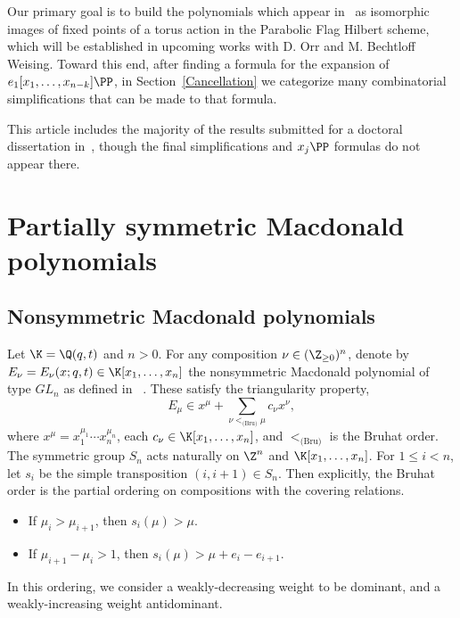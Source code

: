 Our primary goal is to build the polynomials which appear in~\cite{MR4081116} as isomorphic images of fixed points of a torus action in the Parabolic Flag Hilbert scheme, which will be established in upcoming works with D. Orr and M. Bechtloff Weising. Toward this end, after finding a formula for the expansion of $e_1[x_1, \dotsc, x_{n-k}] \PP$, in Section~\ref{Cancellation} we categorize many combinatorial simplifications that can be made to that formula.

This article includes the majority of the results submitted for a doctoral dissertation in~\cite{Dissertation}, though the final simplifications and $x_j \PP$ formulas do not appear there.



\section{Partially symmetric Macdonald polynomials}

\subsection{Nonsymmetric Macdonald polynomials}

Let $\K=\Q(q,t)$ and $n>0$. For any composition $\nu\in(\Z_{\ge 0})^n$, denote by $E_\nu =E_\nu(x;q,t)\in \K[x_1,\dotsc,x_n]$ the nonsymmetric Macdonald polynomial of type $GL_n$ as defined in ~\cite{MR2405160}. These satisfy the triangularity property,
\begin{equation}\label{Etriangularity} E_\mu \in x^\mu + \sum_{\nu <_{\text{(Bru)}} \mu} c_\nu x^\nu,\end{equation}
where $x^\mu = x_1^{\mu_1} \dotsm x_n^{\mu_n}$, each $c_\nu \in \K[x_1,\dotsc, x_n]$, and $<_{\text{(Bru)}}$ is the Bruhat order. The symmetric group $S_n$ acts naturally on $\Z^n$ and $\K[x_1,\dotsc,x_n]$. For $1\le i<n$, let $s_i$ be the simple transposition $(i,i+1)\in S_n$. Then explicitly, the Bruhat order is the partial ordering on compositions with the covering relations.
\begin{itemize}
    \item If $\mu_i > \mu_{i+1}$, then $s_i(\mu) > \mu$.
    \item If $\mu_{i+1}-\mu_i > 1$, then $s_i(\mu) > \mu + e_i - e_{i+1}$.
\end{itemize}
In this ordering, we consider a weakly-decreasing weight to be dominant, and a weakly-increasing weight antidominant.

